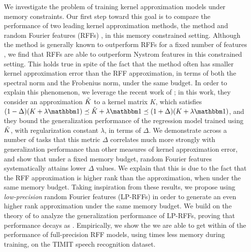 We investigate the problem of training kernel approximation models under memory constraints.  Our first step toward this goal is to compare the performance of two leading kernel approximation methods, the \Nystrom method \citep{nystrom} and random Fourier features (RFFs) \cite{rahimi07random}, in this memory constrained setting.
Although the \Nystrom method is generally known to outperform RFFs for a fixed number of features \citep{nysvsrff12}, we find that RFFs are able to outperform Nystrom features in this constrained setting.  This holds true in spite of the fact that the \Nystrom method often has smaller kernel approximation error than the RFF approximation, in terms of both the spectral norm and the Frobenius norm, under the same budget. 
In order to explain this phenomenon, we leverage the recent work of \citeauthor{avron17}\citep{avron17}; in this work, they consider an approximation $\tilde{K}$ to a kernel matrix $K$, which satisfies $(1-\Delta)(K+\lambda\id) \preceq \tK + \lambda\id \preceq (1+\Delta)(K+\lambda\id)$, and they bound the generalization performance of the regression model trained using $\tilde{K}$, with regularization constant $\lambda$, in terms of $\Delta$.  
We demonstrate across a number of tasks that this metric $\Delta$ correlates much more strongly with generalization performance than other measures of kernel approximation error, and show that under a fixed memory budget, random Fourier features systematically attains lower $\Delta$ values. We explain that this is due to the fact that the RFF approximation is higher rank than the \Nystrom approximation, when under the same memory budget.  Taking inspiration from these results, we propose using \emph{low-precision} random Fourier features (LP-RFFs) in order to generate an even higher rank approximation under the same memory budget. 
We build on the theory of \citeauthor{avron17} to analyze the generalization performance of LP-RFFs, proving that performance decays as .
Empirically, we show the we are able to get within  of the performance of full-precision RFF models, using  times less memory during training, on the TIMIT speech recognition dataset.

